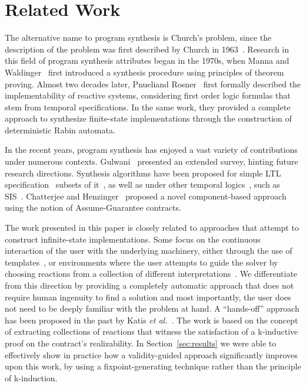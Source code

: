 \section{Related Work}
\label{sec:related}


The alternative name to program synthesis is Church's problem, since the description of the problem was first described by Church in 1963~\cite{church1962logic}. Research in this field of program synthesis attributes began in the 1970s, when Manna and Waldinger~\cite{manna1971toward} first introduced a synthesis procedure using principles of theorem proving. Almost two decades later, Pnueliand Rosner~\cite{pnueli1989synthesis} first formally described the
implementability of reactive systems, considering first order logic formulas
that stem from temporal specifications. In the same work, they provided a
complete approach to synthesize finite-state implementations through the
construction of deterministic Rabin automata.

In the recent years, program synthesis has enjoyed a vast variety of
contributions under numerous contexts. Gulwani~\cite{gulwani2010dimensions}
presented an extended survey, hinting future research directions. Synthesis
algorithms have been proposed for simple LTL specification~\cite{Bohy12,Tini03}
subsets of it~\cite{Klein10,ehlers2010symbolic,cheng2016structural}, as well as under other temporal logics~\cite{monmege2016real,Hamza10}, such as SIS~\cite{Aziz95}.
Chatterjee and Henzinger~\cite{Chatterjee07} proposed a novel component-based approach using the notion of Assume-Guarantee contracts. 

The work presented in this paper is closely related to approaches that attempt
to construct infinite-state implementations. Some focus on the continuous
interaction of the user with the underlying machinery, either through the use of
templates~\cite{srivastava2013template,beyene2014constraint}, or environments where the user attempts to guide the solver by choosing reactions from a collection of different
interpretations~\cite{ryzhyk2016developing}. We differentiate from this
direction by providing a completely automatic approach that does not require
human ingenuity to find a solution and most importantly, the user
does not need to be deeply familiar with the problem at hand. A ``hands-off''
approach has been proposed in the past by Katis \textit{et
al.}~\cite{gacek2015towards,katis2016towards,katis2016synthesis}. The work is
based on the concept of extracting collections of reactions that witness the satisfaction of a k-inductive proof on the contract's realizability. In
Section~\ref{sec:results} we were able to effectively show in practice how a
validity-guided approach significantly improves upon this work, by using a
fixpoint-generating technique rather than the principle of k-induction.

